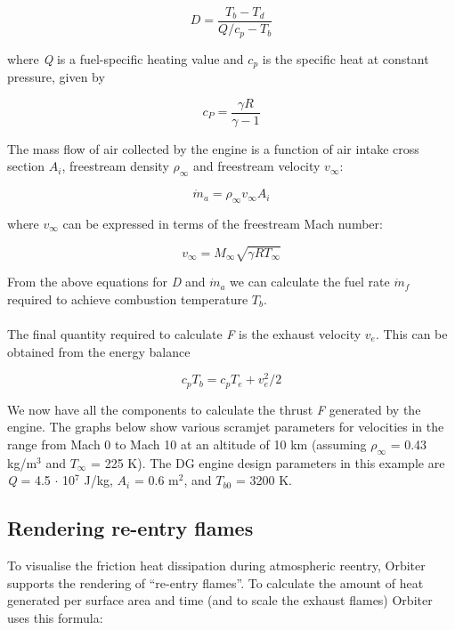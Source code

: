 \documentclass[Orbiter Developer Manual.tex]{subfiles}
\begin{document}
\[ D = \frac{T_{b} - T_{d}}{Q / c_{p} - T_{b}} \]

\noindent
where \textit{Q} is a fuel-specific heating value and $c_{p}$ is the specific heat at constant pressure, given by

\[ c_{P} = \frac{\gamma R}{\gamma - 1} \]

\noindent
The mass flow of air collected by the engine is a function of air intake cross section $A_{i}$, freestream density $\rho_{\infty}$ and freestream velocity $v_{\infty}$:

\[ \dot{m}_{a} = \rho_{\infty} v_{\infty} A_{i} \]

\noindent
where $v_{\infty}$ can be expressed in terms of the freestream Mach number:

\[ v_{\infty} = M_{\infty} \sqrt{\gamma R T_{\infty}} \]

\noindent
From the above equations for \textit{D} and $\dot{m}_{a}$ we can calculate the fuel rate $\dot{m}_{f}$ required to achieve combustion temperature $T_{b}$.\\
\\
The final quantity required to calculate \textit{F} is the exhaust velocity $v_{e}$. This can be obtained from the energy balance

\[ c_{p} T_{b} = c_{p} T_{e} + v^{2}_{e} / 2 \]

\noindent
We now have all the components to calculate the thrust \textit{F} generated by the engine. The graphs below show various scramjet parameters for velocities in the range from Mach 0 to Mach 10 at an altitude of 10 km (assuming $\rho_{\infty}$ = 0.43 kg/m$^{3}$ and $T_{\infty}$ = 225 K). The DG engine design parameters in this example are \textit{Q} = 4.5 $\cdot$ 10$^{7}$ J/kg, $A_{i}$ = 0.6 m$^{2}$, and $T_{b0}$ = 3200 K.

\begin{figure}[H]
	\centering
\end{figure}


\subsection{Rendering re-entry flames}
To visualise the friction heat dissipation during atmospheric reentry, Orbiter supports the rendering of “re-entry flames”. To calculate the amount of heat generated per surface area and time (and to scale the exhaust flames) Orbiter uses this formula:
\end{document}
